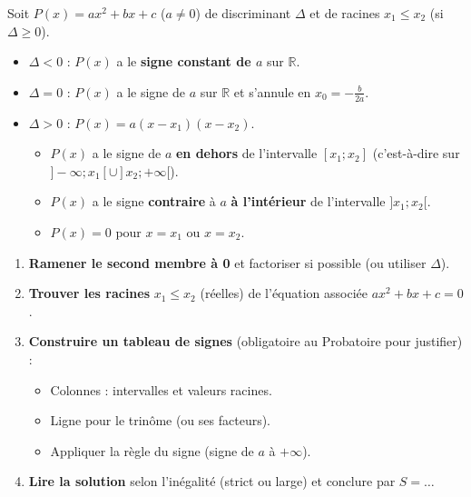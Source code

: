 \documentclass[11pt]{article}
\begin{document}
\begin{propriete}
Soit $P(x) = ax^2+bx+c$ ($a \neq 0$) de discriminant $\Delta$ et de racines $x_1 \le x_2$ (si $\Delta \ge 0$).
\begin{itemize}
  \item \textbf{$\Delta < 0$} : $P(x)$ a le \textbf{signe constant de $a$} sur $\mathbb{R}$.
  \item \textbf{$\Delta = 0$} : $P(x)$ a le signe de $a$ sur $\mathbb{R}$ et s'annule en $x_0 = -\frac{b}{2a}$.
  \item \textbf{$\Delta > 0$} : $P(x) = a(x-x_1)(x-x_2)$.
    \begin{itemize}
      \item $P(x)$ a le signe de $a$ \textbf{en dehors} de l'intervalle $[x_1; x_2]$ (c'est-à-dire sur $]-\infty; x_1[ \cup ]x_2; +\infty[$).
      \item $P(x)$ a le signe \textbf{contraire} à $a$ \textbf{à l'intérieur} de l'intervalle $]x_1; x_2[$.
      \item $P(x) = 0$ pour $x = x_1$ ou $x = x_2$.
    \end{itemize}
\end{itemize}
\end{propriete}

\begin{methode}
\begin{enumerate}
\item \textbf{Ramener le second membre à 0} et factoriser si possible (ou utiliser $\Delta$).
\item \textbf{Trouver les racines} $x_1 \le x_2$ (réelles) de l'équation associée $ax^2+bx+c=0$.
\item \textbf{Construire un tableau de signes} (obligatoire au Probatoire pour justifier) :
  \begin{itemize}
    \item Colonnes : intervalles et valeurs racines.
    \item Ligne pour le trinôme (ou ses facteurs).
    \item Appliquer la règle du signe (signe de $a$ à $+\infty$).
  \end{itemize}
\item \textbf{Lire la solution} selon l'inégalité (strict ou large) et conclure par $S = \dots$
\end{enumerate}
\end{methode}
\end{document}
